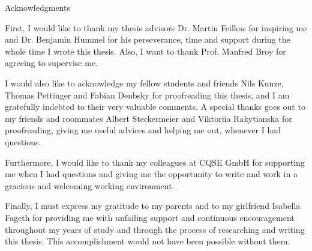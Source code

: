 \thispagestyle{empty}

\vspace*{20mm}

\begin{center}
{ Acknowledgments}
\end{center}

\vspace{10mm}
First, I would like to thank my thesis advisors Dr. Martin Feilkas for inspiring me and Dr. Benjamin Hummel for his perseverance, time and support during the whole time I wrote this thesis.
Also, I want to thank Prof. Manfred Broy for agreeing to supervise me.

I would also like to acknowledge my fellow students and friends Nils Kunze, Thomas Pettinger and Fabian Denbsky for proofreading this thesis, and I am gratefully indebted to their very valuable comments.
A special thanks goes out to my friends and roommates Albert Steckermeier and Viktoriia Rakytianska for proofreading, giving me useful advices and helping me out, whenever I had questions.

Furthermore, I would like to thank my colleagues at CQSE GmbH for supporting me when I had questions and giving me the opportunity to write and work in a gracious and welcoming working environment.

Finally, I must express my gratitude to my parents and to my girlfriend Isabella Fageth for providing me with unfailing support and continuous encouragement throughout my years of study and through the process of researching and writing this thesis.
This accomplishment would not have been possible without them.

\cleardoublepage{}
